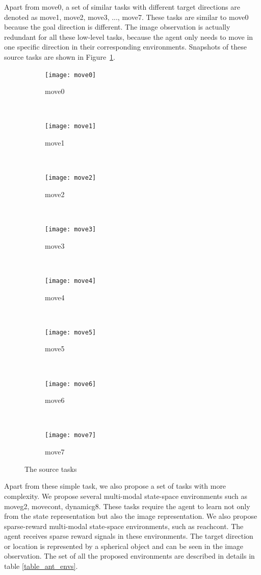 Apart from move0, a set of similar tasks with different target directions are denoted as move1, move2, move3, ..., move7. These tasks are similar to move0 because the goal direction is different. The image observation is actually redundant for all these low-level tasks, because the agent only needs to move in one specific direction in their corresponding environments. Snapshots of these source tasks are shown in Figure~\ref{fig:task8}.
\begin{figure}[!htbp]
	\centering
	\begin{subfigure}[t]{0.3\textwidth}
		\centering
		\texttt{[image: move0]}
		\caption{move0}
	\end{subfigure}%
	~ 
	\begin{subfigure}[t]{0.3\textwidth}
		\centering
		\texttt{[image: move1]}
		\caption{move1}
	\end{subfigure}
	~ 
	\begin{subfigure}[t]{0.3\textwidth}
		\centering
		\texttt{[image: move2]}
		\caption{move2}
	\end{subfigure}
	~ 
	\begin{subfigure}[t]{0.3\textwidth}
		\centering
		\texttt{[image: move3]}
		\caption{move3}
	\end{subfigure}
	~ 
	\begin{subfigure}[t]{0.3\textwidth}
		\centering
		\texttt{[image: move4]}
		\caption{move4}
	\end{subfigure}
	~ 
	\begin{subfigure}[t]{0.3\textwidth}
		\centering
		\texttt{[image: move5]}
		\caption{move5}
	\end{subfigure}
	~ 
	\begin{subfigure}[t]{0.3\textwidth}
		\centering
		\texttt{[image: move6]}
		\caption{move6}
	\end{subfigure}
	~ 
	\begin{subfigure}[t]{0.3\textwidth}
		\centering
		\texttt{[image: move7]}
		\caption{move7}
	\end{subfigure}

	\caption{The source tasks}
	\label{fig:task8}
\end{figure}

Apart from these simple task, we also propose a set of tasks with more complexity. We propose several multi-modal state-space environments such as moveg2, movecont, dynamicg8. These tasks require the agent to learn not only from the state representation but also the image representation. We also propose sparse-reward multi-modal state-space environments, such as reachcont. The agent receives sparse reward signals in these environments. The target direction or location is represented by a spherical object and can be seen in the image observation.
The set of all the proposed environments are described in details in table \ref{table_ant_envs}.


